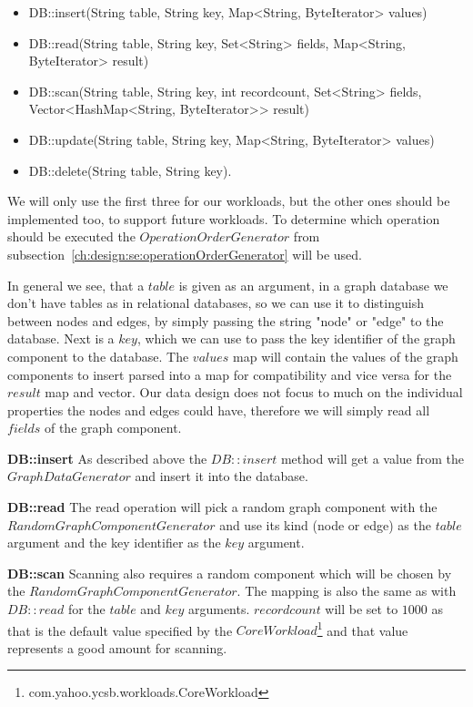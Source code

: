 \begin{itemize}
  \item DB::insert(String table, String key, Map<String, ByteIterator> values)
  \item DB::read(String table, String key, Set<String> fields, Map<String, ByteIterator> result)
  \item DB::scan(String table, String key, int recordcount, Set<String> fields, Vector<HashMap<String, ByteIterator>{}> result)
  \item DB::update(String table, String key, Map<String, ByteIterator> values)
  \item DB::delete(String table, String key).
\end{itemize}

We will only use the first three for our workloads,
but the other ones should be implemented too,
to support future workloads.
To determine which operation should be executed the $ OperationOrderGenerator $ from subsection~\ref{ch:design:se:operationOrderGenerator} will be used.

In general we see,
that a $ table $ is given as an argument,
in a graph database we don't have tables as in relational databases,
so we can use it to distinguish between nodes and edges,
by simply passing the string "node" or "edge" to the database.
Next is a $ key $,
which we can use to pass the key identifier of the graph component to the database.
The $ values $ map will contain the values of the graph components to insert parsed into a map for compatibility and vice versa for the $ result $ map and vector.
Our data design does not focus to much on the individual properties the nodes and edges could have,
therefore we will simply read all $ fields $ of the graph component.

\textbf{DB::insert} \newline
As described above the $ DB::insert $ method will get a value from the \linebreak
$ GraphDataGenerator $ and insert it into the database.

\textbf{DB::read} \newline
The read operation will pick a random graph component with the \linebreak
$ RandomGraphComponentGenerator $ and use its kind (node or edge) as the $ table $ argument and the key identifier as the $ key $ argument.

\textbf{DB::scan} \newline
Scanning also requires a random component which will be chosen by the \linebreak
$ RandomGraphComponentGenerator $.
The mapping is also the same as with $ DB::read $ for the $ table $ and $ key $ arguments.
$ recordcount $ will be set to $ 1000 $ as that is the default value specified by the $ CoreWorkload $\footnote{com.yahoo.ycsb.workloads.CoreWorkload} and that value represents a good amount for scanning.

